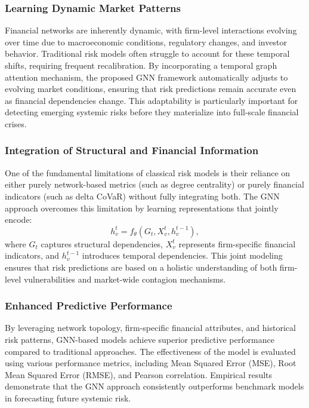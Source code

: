 \documentclass[preprint,12pt,authoryear]{elsarticle}
\begin{document}
\subsubsection{Learning Dynamic Market Patterns}  

Financial networks are inherently dynamic, with firm-level interactions evolving over time due to macroeconomic conditions, regulatory changes, and investor behavior. Traditional risk models often struggle to account for these temporal shifts, requiring frequent recalibration. By incorporating a temporal graph attention mechanism, the proposed GNN framework automatically adjusts to evolving market conditions, ensuring that risk predictions remain accurate even as financial dependencies change. This adaptability is particularly important for detecting emerging systemic risks before they materialize into full-scale financial crises.

\subsubsection{Integration of Structural and Financial Information}  

One of the fundamental limitations of classical risk models is their reliance on either purely network-based metrics (such as degree centrality) or purely financial indicators (such as delta CoVaR) without fully integrating both. The GNN approach overcomes this limitation by learning representations that jointly encode:
\[
h_v^t = f_{\theta}(G_t, X_v^t, h_v^{t-1}),
\]
where \( G_t \) captures structural dependencies, \( X_v^t \) represents firm-specific financial indicators, and \( h_v^{t-1} \) introduces temporal dependencies. This joint modeling ensures that risk predictions are based on a holistic understanding of both firm-level vulnerabilities and market-wide contagion mechanisms.

\subsubsection{Enhanced Predictive Performance}  

By leveraging network topology, firm-specific financial attributes, and historical risk patterns, GNN-based models achieve superior predictive performance compared to traditional approaches. The effectiveness of the model is evaluated using various performance metrics, including Mean Squared Error (MSE), Root Mean Squared Error (RMSE), and Pearson correlation. Empirical results demonstrate that the GNN approach consistently outperforms benchmark models in forecasting future systemic risk.
\end{document}
